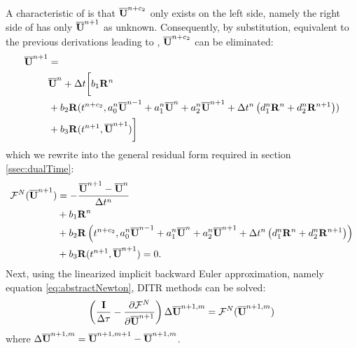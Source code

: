 A characteristic of  is that
$\overline{\mathbf{U}}^{n+c_2}$ only exists on the left side, namely the
right side of  has only $\overline{\mathbf{U}}^{n+1}$ as
unknown. Consequently, by substitution, equivalent
to the previous derivations leading to ,
$\overline{\mathbf{U}}^{n+c_2}$ can be eliminated:
\begin{equation}
    \begin{aligned}
        \overline{\mathbf{U}}^{n+1} & =                       \\
                  & \overline{\mathbf{U}}^{n} + {\Delta} t\biggl[
        b_1 \mathbf{R}^n                            \\
                  & +
            b_2 \mathbf{R}(t^{n+c_2},a^n_0\overline{\mathbf{U}}^{n - 1} +
            a^n_1\overline{\mathbf{U}}^{n} +
            a^n_2\overline{\mathbf{U}}^{n + 1}
            +
            {\Delta} t^n
            \left(
            d^n_1\mathbf{R}^{n} +
            d^n_2\mathbf{R}^{n + 1}
        \right))                            \\
                  & +
            b_3 \mathbf{R}(t^{n+1},\overline{\mathbf{U}}^{n+1})
            \biggr]
        \label{eq:nestedDITR}
    \end{aligned}
\end{equation}
which we rewrite into the general residual form required in section \ref{ssec:dualTime}:
\begin{equation}
    \begin{aligned}
        \mathcal{F}^N(\overline{\mathbf{U}}^{n+1}) & = -\frac{\overline{\mathbf{U}}^{n+1} - \overline{\mathbf{U}}^{n}}{{\Delta} t^n} \\
                         & +
        b_1 \mathbf{R}^n                                                   \\
                         & +
        b_2 \mathbf{R}\left(t^{n+c_2},a^n_0\overline{\mathbf{U}}^{n - 1} +
        a^n_1\overline{\mathbf{U}}^{n} +
        a^n_2\overline{\mathbf{U}}^{n + 1}
        +
        {\Delta} t^n
        \left(
        d^n_1\mathbf{R}^{n} +
        d^n_2\mathbf{R}^{n + 1}
        \right)\right)                                             \\
                         & +
        b_3 \mathbf{R}(t^{n+1},\overline{\mathbf{U}}^{n+1}) = 0.
        \label{eq:nestedDITR_F}
    \end{aligned}
\end{equation}
Next, using the linearized implicit backward Euler approximation,
namely equation \eqref{eq:abstractNewton}, DITR methods can be solved:
\begin{equation}
    \left(\frac{\eye}{\inc\tau} -
    \partialderivative{\FF^N}{\uu^{n+1}}  \right)
    \inc\uu^{n+1,m} = \FF^N(\uu^{n+1,m})
    \label{eq:abstractNewtonNested}
\end{equation}
where ${\Delta}\overline{\mathbf{U}}^{n+1,m}=\overline{\mathbf{U}}^{n+1,m+1}-\overline{\mathbf{U}}^{n+1,m}$.

